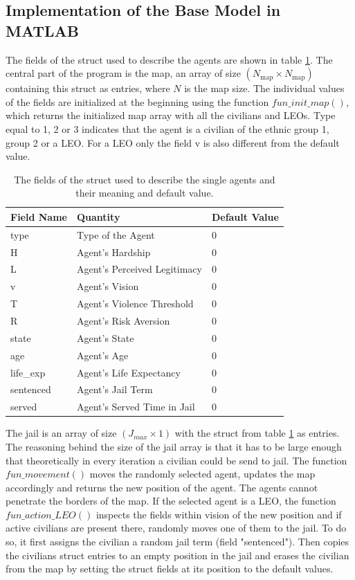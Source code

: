 \documentclass[11pt]{article}
\begin{document}
\subsection{Implementation of the Base Model in MATLAB}
\label{sec:imp_base}
The fields of the struct used to describe the agents are shown in table \ref{tab:fields_struct}. The central part of the program is the map, an array of size $(N_{\text{map}} \times N_{\text{map}})$ containing this struct as entries, where $N$ is the map size. The individual values of the fields are initialized at the beginning using the function $fun\_init\_map()$, which returns the initialized map array with all the civilians and LEOs. Type equal to 1, 2 or 3 indicates that the agent is a civilian of the ethnic group 1, group 2 or a LEO. For a LEO only the field v is also different from the default value.
\begin{table}[!htbp]
	\centering
	\caption{The fields of the struct used to describe the single agents and their meaning and default value.}
	\vspace{0.5 cm}
		\begin{tabular}{l | l | l} 
			Field Name & Quantity & Default Value\\
			\hline
			type & Type of the Agent & 0\\
			H & Agent's Hardship & 0\\
			L & Agent's Perceived Legitimacy & 0\\
			v & Agent's Vision & 0\\
			T & Agent's Violence Threshold & 0\\
			R & Agent's Risk Aversion & 0\\
			state & Agent's State & 0\\
			age & Agent's Age & 0\\
			life\_exp & Agent's Life Expectancy & 0\\
			sentenced & Agent's Jail Term & 0\\
			served & Agent's Served Time in Jail & 0
	\end{tabular}
	\label{tab:fields_struct}
\end{table}
The jail is an array of size $(J_{max} \times 1)$ with the struct from table \ref{tab:fields_struct} as entries. The reasoning behind the size of the jail array is that it has to be large enough that theoretically in every iteration a civilian could be send to jail. The function $fun\_movement()$ moves the randomly selected agent, updates the map accordingly and returns the new position of the agent. The agents cannot penetrate the borders of the map. If the selected agent is a LEO, the function $fun\_action\_LEO()$ inspects the fields within vision of the new position and if active civilians are present there, randomly moves one of them to the jail. To do so, it first assigns the civilian a random jail term (field "sentenced"). Then copies the civilians struct entries to an empty position in the jail and erases the civilian from the map by setting the struct fields at its position to the default values.\\
\end{document}
